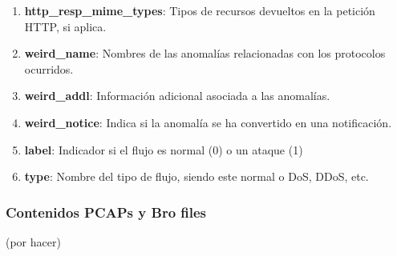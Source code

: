 \begin{enumerate}
  \item \textbf{http\_resp\_mime\_types}: Tipos de recursos devueltos en la petición HTTP, si aplica.
  \item \textbf{weird\_name}: Nombres de las anomalías relacionadas con los protocolos ocurridos.
  \item \textbf{weird\_addl}: Información adicional asociada a las anomalías.
  \item \textbf{weird\_notice}: Indica si la anomalía se ha convertido en una notificación.
  \item \textbf{label}: Indicador si el flujo es normal (0) o un ataque (1)
  \item \textbf{type}: Nombre del tipo de flujo, siendo este normal o DoS, DDoS, etc.
\end{enumerate}

\subsubsection{Contenidos PCAPs y Bro files}

(por hacer)
